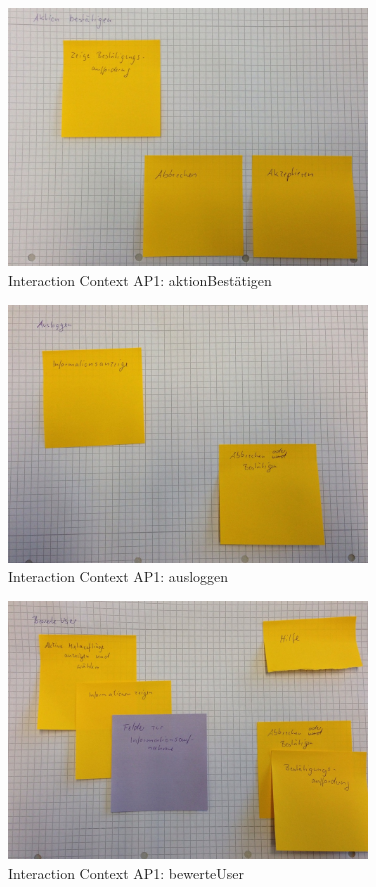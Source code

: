 \begin{figure}[H]
\centering
\includegraphics[width=0.85\textwidth]{./images/abstract/version1/aktionBestaetigen.JPG}
\caption{Interaction Context AP1: aktionBestätigen}
\label{interfaceContents21}
\end{figure}


\begin{figure}[H]
\centering
\includegraphics[width=0.85\textwidth]{./images/abstract/version1/ausloggen.JPG}
\caption{Interaction Context AP1: ausloggen}
\label{interfaceContents22}
\end{figure}

\begin{figure}[H]
\centering
\includegraphics[width=0.85\textwidth]{./images/abstract/version1/bewerteUser.JPG}
\caption{Interaction Context AP1: bewerteUser}
\label{interfaceContents23}
\end{figure}


